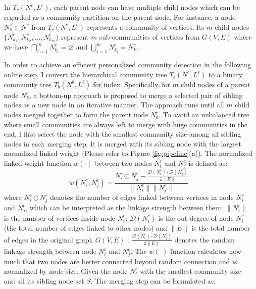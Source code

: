 In \textit{$T_{c}(N^{c},L^{c})$}, each parent node can have multiple child nodes which can be regarded as a community partition on the parent node. For instance, a node $N_{k}^{c} \in N^{c}$ from $T_{c}(N^{c},L^{c})$ represents a community of vertices.  Its $m$ child nodes $\{N_{k_{1}}^{c},N_{k_{2}}^{c},...,N_{k_{m}}^{c}\}$ represent $m$ sub-communities of vertices from $G(V,E)$ where we have $	\bigcap_{i=1}^{m} N_{k_{i}}^{c} = \varnothing$ and  $	\bigcup_{i=1}^{m} N_{k_{i}}^{c} =  N_{k}^{c}$.  

In order to achieve an efficient personalized community detection in the following online step, I convert the hierarchical community tree \textit{$T_{c}(N^{c},L^{c})$} to a binary community tree \textit{$T_{b}(N^{b},L^{b})$} for index. Specifically, for $m$ child nodes of a parent node $N_{k}^{c}$, a bottom-up approach is proposed to merge a selected pair of sibling nodes as a new node in an iterative manner. The approach runs until all $m$ child nodes merged together to form the parent node $N_{k}^{c}$. To avoid an unbalanced tree where small communities are always left to merge with huge communities in the end, I first select the node with the smallest community size among all sibling nodes in each merging step. It is merged with its sibling node with the largest normalized linked weight (Please refer to Figure \ref{fig:pipeline}(a)). The normalized linked weight function $w(\cdot)$ between  two nodes $N_{i}^{c}$ and $N_{j}^{c}$ is defined as:
\begin{equation} 
\textit{$w(N_{i}^{c},N_{j}^{c})$} =\frac{\textit{$N_{i}^{c}\odot N_{j}^{c}$}-\frac{\mathcal{D}(N_{i}^{c})\cdot \mathcal{D}(N_{j}^{c})}{2\lVert E \rVert} }{\textit{$\lVert N_{i}^{c}\rVert\lVert N_{j}^{c}\rVert$}} 
\end{equation} 
where \textit{$N_{i}^{c}\odot N_{j}^{c}$} denotes the number of edges linked between vertices in node \textit{$N_{i}^{c}$} and \textit{$N_{j}^{c}$}, which can be interpreted as the linkage strength between them; \textit{$\lVert  N_{i}^{c}\rVert$} is the number of vertices inside node \textit{$N_{i}^{c}$}; \textit{$\mathcal{D}(N_{i}^{c})$} is the out-degree of node \textit{$N_{i}^{c}$} (the total number of edges linked to other nodes) and \textit{$\lVert E\rVert$} is the total number of edges in the original graph $G(V,E)$ . $\frac{\mathcal{D}(N_{i}^{c})\cdot \mathcal{D}(N_{j}^{c})}{2\lVert E \rVert} $ denotes the random linkage strength between node \textit{$N_{i}^{c}$} and \textit{$N_{j}^{c}$}. The \textit{$w(\cdot)$} function calculates how much that two nodes are better connected beyond random connection and is normalized by node size. Given the node $N_{i}^{c}$ with the smallest community size and all its sibling node set $S$, The merging step can be formulated as:
